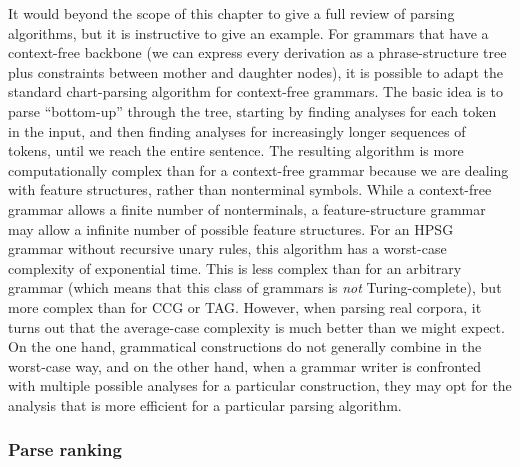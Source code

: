\documentclass[output=paper,nonflat]{langsci/langscibook}
\begin{document}
It would beyond the scope of this chapter
to give a full review of parsing algorithms,
but it is instructive to give an example.
For grammars that have a context-free backbone
(we can express every derivation as a phrase-structure tree
plus constraints between mother and daughter nodes),
it is possible to adapt the standard chart-parsing algorithm for context-free grammars.
The basic idea is to parse ``bottom-up'' through the tree,
starting by finding analyses for each token in the input,
and then finding analyses for increasingly longer sequences of tokens,
until we reach the entire sentence.
The resulting algorithm is more computationally complex than for a context-free grammar
because we are dealing with feature structures, rather than nonterminal symbols.
While a context-free grammar allows a finite number of nonterminals,
a feature-structure grammar may allow a infinite number of possible feature structures.
For an HPSG grammar without recursive unary rules,
this algorithm has a worst-case complexity of exponential time.
This is less complex than for an arbitrary grammar
(which means that this class of grammars is \emph{not} Turing-complete),
but more complex than for CCG or TAG.
However, when parsing real corpora,
it turns out that the average-case complexity is much better than we might expect.
On the one hand, grammatical constructions do not generally combine in the worst-case way,
and on the other hand, when a grammar writer is confronted
with multiple possible analyses for a particular construction,
they may opt for the analysis that is more efficient for a particular parsing algorithm.



\subsubsection{Parse ranking}
\label{cl:prac:rank}
\end{document}
